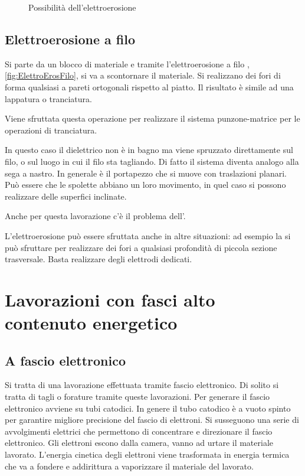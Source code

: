 \begin{figure}
\centering
{}\quad
{}
\caption{Possibilità dell'elettroerosione}
\label{fig:ElettroEros}
\end{figure}

\subsection{Elettroerosione a filo}
Si parte da un blocco di materiale e tramite l'elettroerosione a filo , \ref{fig:ElettroErosFilo}, si va a scontornare il materiale.
Si realizzano dei fori di forma qualsiasi a pareti ortogonali rispetto al piatto. Il risultato è simile ad una lappatura o tranciatura.

Viene sfruttata questa operazione per realizzare il sistema punzone-matrice per le operazioni di tranciatura.

In questo caso il dielettrico non è in bagno ma viene spruzzato direttamente sul filo, o sul luogo in cui il filo sta tagliando.
Di fatto il sistema diventa analogo alla sega a nastro.
In generale è il portapezzo che si muove con traslazioni planari. Può essere che le spolette abbiano un loro movimento, in quel caso si possono realizzare delle superfici inclinate.

Anche per questa lavorazione c'è il problema dell'. 

L'elettroerosione può essere sfruttata anche in altre situazioni: ad esempio la si può sfruttare per realizzare dei fori a qualsiasi profondità di piccola sezione trasversale. Basta realizzare degli elettrodi dedicati.

\section{Lavorazioni con fasci alto contenuto energetico}
\subsection{A fascio elettronico}
Si tratta di una lavorazione effettuata tramite fascio elettronico.
Di solito si tratta di tagli o forature tramite queste lavorazioni.
Per generare il fascio elettronico avviene su tubi catodici.
In genere il tubo catodico è a vuoto spinto per garantire migliore precisione del fascio di elettroni.
Si susseguono una serie di avvolgimenti elettrici che permettono di concentrare e direzionare il fascio elettronico.
Gli elettroni escono dalla camera, vanno ad urtare il materiale lavorato.
L'energia cinetica degli elettroni viene trasformata in energia termica che va a fondere e addirittura a vaporizzare il materiale del lavorato.

